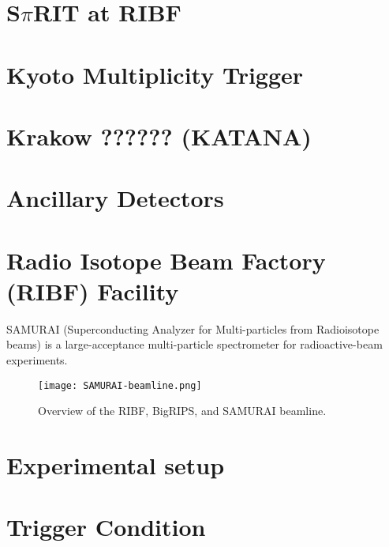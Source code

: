\section{S$\pi$RIT at RIBF}

\section{Kyoto Multiplicity Trigger}
\section{Krakow ?????? (KATANA)}
\section{Ancillary Detectors }
\section{Radio Isotope Beam Factory (RIBF) Facility }


SAMURAI (Superconducting Analyzer for Multi-particles from Radioisotope beams) is a large-acceptance multi-particle spectrometer for radioactive-beam experiments.
\begin{figure}[H]
\texttt{[image: SAMURAI-beamline.png]}
\caption{Overview of the RIBF, BigRIPS, and SAMURAI beamline.}
\label{fig:sambl}
\end{figure}

\section{Experimental setup}
\section{Trigger Condition}
